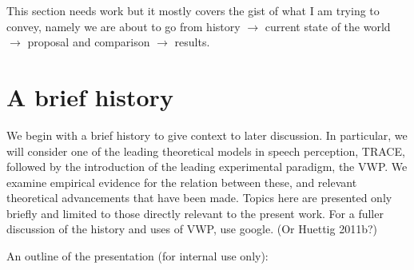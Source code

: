 \documentclass{article}
\begin{document}
This section needs work but it mostly covers the gist of what I am trying to convey, namely we are about to go from history $\rightarrow$ current state of the world $\rightarrow$ proposal and comparison $\rightarrow$ results.




\section{A brief history}
We begin with a brief history to give context to later discussion. In particular, we will consider one of the leading theoretical models in speech perception, TRACE, followed by the introduction of the leading experimental paradigm, the VWP. We examine empirical evidence for the relation between these, and relevant theoretical advancements that have been made. Topics here are presented only briefly and limited to those directly relevant to the present work. For a fuller discussion of the history and uses of VWP, use google. (Or Huettig 2011b?)

An outline of the presentation (for internal use only):
\end{document}
